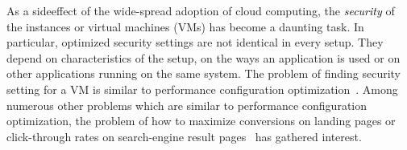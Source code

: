 As a sideeffect of the wide-spread adoption of cloud computing, the \textcolor{black}{{\em security}} of the instances or virtual machines (VMs) has become a daunting task. In particular, optimized security settings are not identical in every setup. They depend on characteristics of the setup, on the ways an application is used or on other applications running on the same system. The problem of finding security setting for a VM is similar to performance configuration optimization~\cite{biedermann2014hot, biedermann2014leveraging, drabik2003method, security1, security2}. 
Among numerous other problems which are similar to performance configuration optimization, the problem of how to maximize conversions on landing pages or click-through rates on search-engine result pages~\cite{hill2017efficient, wang2016beyond, zhu2017optimized} has gathered interest.  


